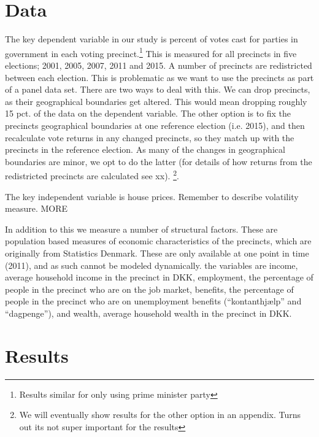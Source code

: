 \documentclass[12pt,a4paper]{article}
\begin{document}
\section{Data}
The key dependent variable in our study is percent of votes cast for parties in government in each voting precinct.\footnote{Results similar for only using prime minister party} This is measured for all precincts in five elections; 2001, 2005, 2007, 2011 and 2015. A number of precincts are redistricted between each election. This is problematic as we want to use  the precincts as part of a panel data set. There are two ways to deal with this. We can drop precincts, as their geographical boundaries get altered. This would mean dropping roughly 15 pct. of the data on the dependent variable. The other option is to fix the precincts geographical boundaries at one reference election (i.e. 2015), and then recalculate vote returns in any changed precincts, so they match up with the precincts in the reference election.  As many of the changes in geographical boundaries are minor, we opt to do the latter (for details of how returns from the redistricted precincts are calculated see xx). \footnote{We will eventually show results for the other option in an appendix. Turns out its not super important for the results}. 

The key independent variable is house prices. Remember to describe volatility measure. MORE

In addition to this we measure a number of structural factors. These are population based measures of economic characteristics of the precincts, which are originally from Statistics Denmark. These are only available at one point in time (2011), and as such cannot be modeled dynamically. the variables are income, average household income in the precinct in DKK,  employment, the percentage of people in the precinct who are on the job market, benefits, the percentage of people in the precinct who are on unemployment benefits (``kontanthjælp'' and ``dagpenge''), and wealth, average household wealth in the precinct in DKK.  


\section{Results}









\end{document}
